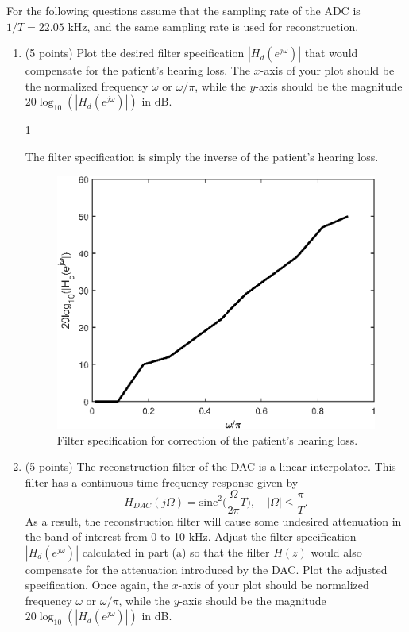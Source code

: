 \documentclass[10pt]{article}
\def\SOLUTIONS{0} %
\def\SolutionsColor{red2}
\begin{document}
For the following questions assume that the sampling rate of the ADC is $1/T = 22.05$ kHz, and the same sampling rate is used for reconstruction.
\begin{enumerate}[label=(\alph*)]
	\item (5 points) Plot the desired filter specification $|H_d(e^{j\omega})|$ that would compensate for the patient's hearing loss. The $x$-axis of your plot should be the normalized frequency $\omega$ or $\omega/\pi$, while the $y$-axis should be the magnitude $20\log_{10}(|H_d(e^{j\omega})|)$ in dB.
	
	\if\SOLUTIONS1
	{\color{\SolutionsColor} The filter specification is simply the inverse of the patient's hearing loss.
		
		\FloatBarrier
		\begin{figure}[h!]
			\centering
			\includegraphics[scale=0.6]{figs/hearing_aid_spec.eps}
			\caption{Filter specification for correction of the patient's hearing loss.}
		\end{figure}
		\FloatBarrier
	}
	\fi
	
	\item (5 points) The reconstruction filter of the DAC is a linear interpolator. This filter has a continuous-time frequency response given by
	\begin{equation}
	H_{DAC}(j\Omega) = \mathrm{sinc}^2\Big(\frac{\Omega}{2\pi}T\Big), \quad |\Omega| \leq \frac{\pi}{T}.
	\end{equation}
	As a result, the reconstruction filter will cause some undesired attenuation in the band of interest from 0 to 10 kHz. Adjust the filter specification $|H_d(e^{j\omega})|$ calculated in part (a) so that the filter $H(z)$ would also compensate for the attenuation introduced by the DAC. Plot the adjusted specification. Once again, the $x$-axis of your plot should be normalized frequency $\omega$ or $\omega/\pi$, while the $y$-axis should be the magnitude $20\log_{10}(|H_d(e^{j\omega})|)$ in dB.
	

\end{enumerate}
\end{document}
